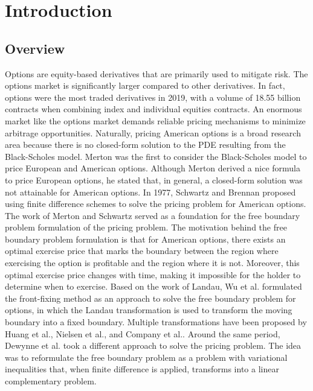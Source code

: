 \section{Introduction}

\subsection{Overview}

Options are equity-based derivatives that are primarily used to mitigate risk. The options market is significantly larger compared to other derivatives. In fact, options were the most traded derivatives in 2019, with a volume of 18.55 billion contracts when combining index and individual equities contracts\cite{statista_2019}. An enormous market like the options market demands reliable pricing mechanisms to minimize arbitrage opportunities. Naturally, pricing American options is a broad research area because there is no closed-form solution to the PDE resulting from the Black-Scholes model. Merton\cite{merton_1973} was the first to consider the Black-Scholes\cite{black_scholes_1973} model to price European and American options. Although Merton derived a nice formula to price European options, he stated that, in general, a closed-form solution was not attainable for American options. In 1977, Schwartz\cite{schwartz_197779} and Brennan\cite{brennan_1997} proposed using finite difference schemes to solve the pricing problem for American options. The work of Merton and Schwartz served as a foundation for the free boundary problem formulation of the pricing problem. The motivation behind the free boundary problem formulation is that for American options, there exists an optimal exercise price that marks the boundary between the region where exercising the option is profitable and the region where it is not. Moreover, this optimal exercise price changes with time, making it impossible for the holder to determine when to exercise. Based on the work of Landau\cite{landau_1950_heat_ci}, Wu et al.\cite{wu1997front} formulated the front-fixing method as an approach to solve the free boundary problem for options, in which the Landau transformation is used to transform the moving boundary into a fixed boundary. Multiple transformations have been proposed by Huang et al.\cite{huang_2000}, Nielsen et al.\cite{nielsen_2001}, and Company et al.\cite{company_egorova_jodar_2014}. Around the same period, Dewynne et al.\cite{dewynne_howison_rupf_wilmott_1993} took a different approach to solve the pricing problem. The idea was to reformulate the free boundary problem as a problem with variational inequalities that, when finite difference is applied, transforms into a linear complementary problem\cite{cottle_1968}.

